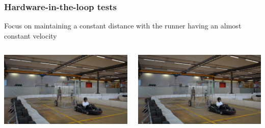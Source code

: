 \documentclass[9pt, aspectratio=169]{beamer}
\begin{document}
\begin{frame}
\frametitle{Hardware-in-the-loop tests}
\centering
Focus on maintaining a constant distance with the runner having an almost constant velocity
\begin{columns}
\begin{column}{0.50\textwidth}
\begin{center}
\href{video.mp4}{
\includegraphics[scale=0.18]
{Poster}}
\end{center}
\end{column}

\begin{column}{0.50\textwidth}
\begin{center}
\href{video1.mp4}{
\includegraphics[scale=0.18]
{Poster}}
\end{center}
\end{column}
\end{columns}
\end{frame}
\end{document}
